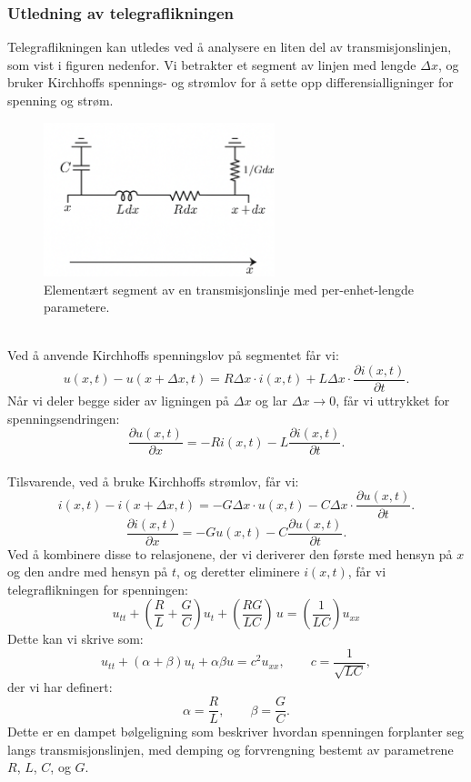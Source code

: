 \subsubsection{Utledning av telegraflikningen}
Telegraflikningen kan utledes ved å analysere en liten del av transmisjonslinjen, som vist i figuren nedenfor. Vi betrakter et segment av linjen med lengde $\Delta x$,  og bruker Kirchhoffs spennings- og strømlov for å sette opp differensialligninger for spenning og strøm.
\begin{figure}[h]
    \centering
    \includegraphics[width=0.6\textwidth]{Media/telegraflinje.png}
    \caption{Elementært segment av en transmisjonslinje med per-enhet-lengde parametere.}
    \label{fig:transmission_line_segment}   
\end{figure}\\
Ved å anvende Kirchhoffs spenningslov på segmentet får vi:
\[
    u(x,t) - u(x+\Delta x,t) = R \Delta x \cdot i(x,t) + L \Delta x \cdot \frac{\partial i(x,t)}{\partial t} .
\]
Når vi deler begge sider av ligningen på $\Delta x$ og lar $\Delta x \to 0$, får vi uttrykket for spenningsendringen:
\begin{equation}
    \frac{\partial u(x,t)}{\partial x} = -R i(x,t) - L \frac{\partial i(x,t)}{\partial t}.
    \label{eq:KVL}
\end{equation}
\\Tilsvarende, ved å bruke Kirchhoffs strømlov, får vi:
\[
    i(x,t) - i(x+\Delta x,t) = -G \Delta x \cdot u(x,t) - C \Delta x \cdot \frac{\partial u(x,t)}{\partial t} .
\] 
\begin{equation}
    \frac{\partial i(x,t)}{\partial x} = -G u(x,t) - C \frac{\partial u(x,t)}{\partial t}.
    \label{eq:KCL}
\end{equation}
Ved å kombinere disse to relasjonene, der vi deriverer den første med hensyn på $x$ og den andre med hensyn på $t$, og deretter eliminere $i(x,t)$, får vi telegraflikningen for spenningen:
\[
    u_{tt} + \left(\frac{R}{L} + \frac{G}{C}\right)u_t + \left(\frac{RG}{LC}\right)\,u = \left(\frac{1}{LC}\right) u_{xx}
\]
\clearpage
\noindent Dette kan vi skrive som:
\begin{equation}
    u_{tt} + (\alpha + \beta)u_t + \alpha \beta u = c^2 u_{xx}, \qquad c = \frac{1}{\sqrt{LC}} ,
    \label{eq:telegraflikningen}
\end{equation}
der vi har definert:
\[
    \alpha = \frac{R}{L}, \qquad \beta = \frac{G}{C} .
\]
Dette er en dampet bølgeligning som beskriver hvordan spenningen forplanter seg langs transmisjonslinjen, med demping og forvrengning bestemt av parametrene $R$, $L$, $C$, og $G$.


